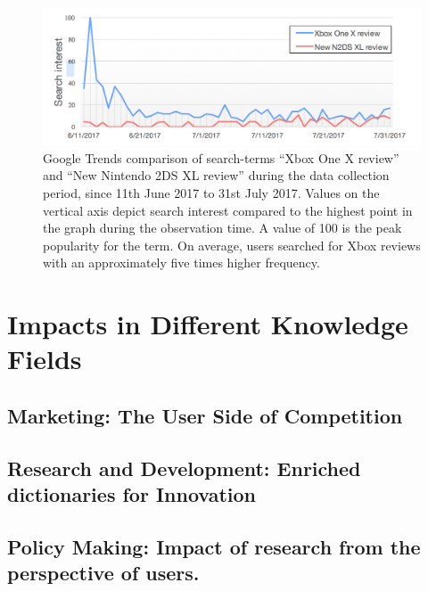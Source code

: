 \documentclass[]{book}
\begin{document}
\begin{figure}

{\centering \includegraphics[width=1\linewidth]{_bookdown_files/figures/tweet_search_interest} 

}

\caption{Google Trends comparison of search-terms “Xbox One X review” and “New Nintendo 2DS XL review” during the data collection period, since 11th June 2017 to 31st July 2017. Values on the vertical axis depict search interest compared to the highest point in the graph during the observation time. A value of 100 is the peak popularity for the term. On average, users searched for Xbox reviews with an approximately five times higher frequency.}\label{fig:tweetsearchinterest}
\end{figure}

\part{Impacts in Different Knowledge
Fields}\label{part-impacts-in-different-knowledge-fields}

\chapter{Marketing: The User Side of
Competition}\label{marketing-the-user-side-of-competition}

\chapter{Research and Development: Enriched dictionaries for
Innovation}\label{research-and-development-enriched-dictionaries-for-innovation}

\chapter{Policy Making: Impact of research from the perspective of
users.}\label{policy-making-impact-of-research-from-the-perspective-of-users.}
\end{document}
